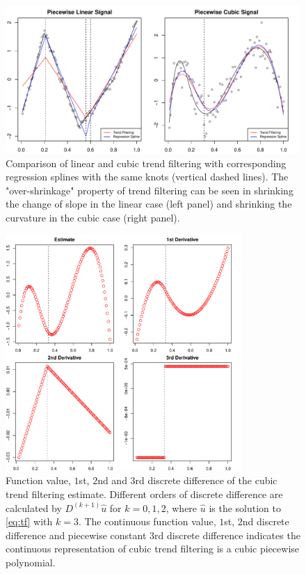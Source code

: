 \documentclass[a4paper]{article}
\begin{document}
\begin{figure}[t!]
\centering
\includegraphics[width = 1.0\textwidth]{Figures/Figure2.pdf}
\caption{Comparison of linear and cubic trend filtering with corresponding regression splines with the same knots (vertical dashed lines). The "over-shrinkage" property of trend filtering can be seen in shrinking the change of slope in the linear case (left panel) and shrinking the curvature in the cubic case (right panel).}
\label{fig:Figure2_overshrinkage}
\end{figure}


\begin{figure}[t!]
\centering
\includegraphics[width = 0.8\textwidth]{Figures/Figure3.pdf}
\caption{Function value, $1$st, $2$nd and $3$rd discrete difference of the cubic trend filtering estimate. Different orders of discrete difference are calculated by $D^{(k+1)}\hat{u}$ for $k=0,1,2$, where $\hat{u}$ is the solution to \eqref{eq:tf} with $k = 3$. The continuous function value, $1$st, $2$nd discrete difference and piecewise constant $3$rd discrete difference indicates the continuous representation of cubic trend filtering is a cubic piecewise polynomial.}
\label{fig:Figure3_discrete}
\end{figure}
\end{document}
